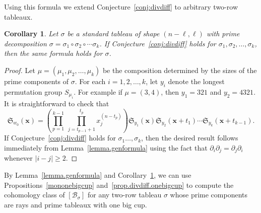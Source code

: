 \documentclass[11pt]{amsart}
\newtheorem{corollary}[theorem]{Corollary}
\theoremstyle{remark}
\theoremstyle{remark}
\theoremstyle{definition}
\theoremstyle{definition}
\theoremstyle{definition}
\numberwithin{equation}{section}
\newcommand{\gs}{\sigma}
\newcommand{\SF}{\mathcal{B}}
\newcommand{\parsum}{t}
\begin{document}
Using this formula we extend Conjecture~\ref{conj:divdiff} to arbitrary two-row tableaux. 

\begin{corollary} \label{conj:divdiff2} Let $\gs$ be a standard tableau of shape $(n-\ell, \ell)$ with prime decomposition $\gs= \gs_1\circ\gs_2\circ\cdots \gs_k$.  If Conjecture~\ref{conj:divdiff} holds for $\gs_1, \gs_2, \ldots, \gs_k$, then the same formula holds for $\gs$. 
\end{corollary}
\begin{proof} Let $\mu=(\mu_1, \mu_2, \ldots, \mu_k)$ be the composition determined by the sizes of the prime components of $\gs$. For each $i=1, 2, \ldots ,k$, let $y_{i}$ denote the longest permutation group $S_{\mu_i}$. For example if $\mu = (3,4)$, then  $y_1=321$ and $y_2=4321$.   It is straightforward to check that 
\[
\mathfrak{S}_{w_0}(\mathbf{x}) = \left( \prod_{p=1}^{k-1}~ \prod_{j=\parsum_{p-1}+1}^{\parsum_p} x_j^{(n-\parsum_p)} \right) \mathfrak{S}_{y_1}(\mathbf{x}) \mathfrak{S}_{y_2}(\mathbf{x}+\parsum_1)\cdots \mathfrak{S}_{y_k}(\mathbf{x}+t_{k-1}).
\]
If Conjecture~\ref{conj:divdiff} holds for $\gs_1 \ldots, \gs_k$, then the desired result follows immediately from Lemma~\ref{lemma.genformula} using the fact that $\partial_i\partial_j = \partial_j \partial_i$ whenever $|i-j|\geq 2$. 
\end{proof}

By Lemma~\ref{lemma.genformula} and Corollary~\ref{conj:divdiff2}, we can use Propositions~\ref{mononebigcup} and~\ref{prop.divdiff.onebigcup} to compute the cohomology class of $[\SF_\gs]$ for any two-row tableau $\gs$ whose prime components are rays and prime tableaux with one big cup.
\end{document}
